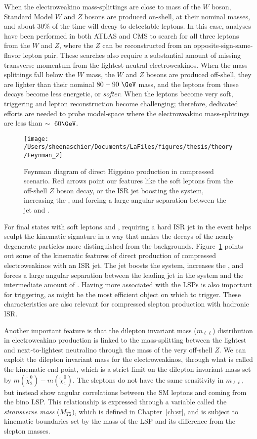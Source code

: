 When the electroweakino mass-splittings are close to mass of the $W$ boson, Standard Model $W$ and $Z$ bosons are produced on-shell, at their nominal masses, and about $30\%$ of the time will decay to detectable leptons.  In this case, analyses have been performed in both ATLAS and CMS to search for all three leptons from the $W$ and $Z$, where the $Z$ can be reconstructed from an opposite-sign-same-flavor lepton pair.  These searches also require a substantial amount of missing transverse momentum from the lightest neutral electroweakinos.  When the mass-splittings fall below the $W$ mass, the $W$ and $Z$ bosons are produced off-shell, they are lighter than their nominal $80-90~\GeV$ mass, and the leptons from these decays become less energetic, or \textit{softer}.  When the leptons become very soft, triggering and lepton reconstruction become challenging; therefore, dedicated efforts are needed to probe model-space where the electroweakino mass-splittings are less than $\sim~60\GeV$. 
   \begin{figure}%
  \begin{center}
  \texttt{[image: /Users/sheenaschier/Documents/LaFiles/figures/thesis/theory/Feynman\_2]}
   \end{center}
 \caption{Feynman diagram of direct Higgsino production in compressed scenario.  Red arrows point our features like the soft leptons from the off-shell $Z$ boson decay, or the ISR jet boosting the system, increasing the \met, and forcing a large angular separation between the jet and \met.}
 \label{fig:fn3}
 \end{figure}
For final states with soft leptons and \met{}, requiring a hard ISR jet in the event helps sculpt the kinematic signature in a way that makes the decays of the nearly degenerate particles more distinguished from the backgrounds.  Figure~\ref{fig:fn3} points out some of the kinematic features of direct production of compressed electroweakinos with an ISR jet.   The jet boosts the system, increases the \met, and forces a large angular separation between the leading jet in the system and the intermediate amount of \met.  Having more \met associated with the LSPs is also important for triggering, as \met might be the most efficient object on which to trigger.  These characteristics are also relevant for compressed slepton production with hadronic ISR.  

Another important feature is that the dilepton invariant mass ($m_{\ell\ell}$) distribution in electroweakino production is linked to the mass-splitting between the lightest and next-to-lightest neutralino through the mass of the very off-shell $Z$.  We can exploit the dilepton invariant mass for the electroweakinos, through what is called the kinematic end-point, which is a strict limit on the dilepton invariant mass set by $m(\tilde\chi_2^0)-m(\tilde\chi_1^0)$. The sleptons do not have the same sensitivity in $m_{\ell\ell}$, but instead show angular correlations between the SM leptons and \met{} coming from the bino LSP.  This relationship is expressed through a variable called the \textit{stransverse mass} ($M_{T2}$), which is defined in Chapter~\ref{ch:sr}, and is subject to kinematic boundaries set by the mass of the LSP and its difference from the slepton masses.

